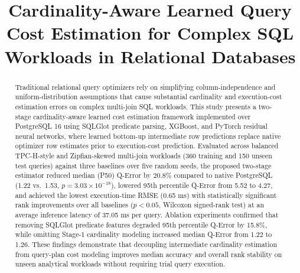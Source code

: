 \documentclass[conference]{IEEEtran}
\begin{document}
\title{Cardinality-Aware Learned Query Cost Estimation for Complex SQL Workloads in Relational Databases}

\author{
\and
{}
}

\maketitle

\begin{abstract}
Traditional relational query optimizers rely on simplifying column-independence and uniform-distribution assumptions that cause substantial cardinality and execution-cost estimation errors on complex multi-join SQL workloads. This study presents a two-stage cardinality-aware learned cost estimation framework implemented over PostgreSQL 16 using SQLGlot predicate parsing, XGBoost, and PyTorch residual neural networks, where learned bottom-up intermediate row predictions replace native optimizer row estimates prior to execution-cost prediction. Evaluated across balanced TPC-H-style and Zipfian-skewed multi-join workloads (360 training and 150 unseen test queries) against three baselines over five random seeds, the proposed two-stage estimator reduced median (P50) Q-Error by 20.8\% compared to native PostgreSQL (1.22 vs.\ 1.53, $p = 3.03 \times 10^{-18}$), lowered 95th percentile Q-Error from 5.52 to 4.27, and achieved the lowest execution-time RMSE (0.65 ms) with statistically significant rank improvements over all baselines ($p < 0.05$, Wilcoxon signed-rank test) at an average inference latency of 37.05 ms per query. Ablation experiments confirmed that removing SQLGlot predicate features degraded 95th percentile Q-Error by 15.8\%, while omitting Stage-1 cardinality modeling increased median Q-Error from 1.22 to 1.26. These findings demonstrate that decoupling intermediate cardinality estimation from query-plan cost modeling improves median accuracy and overall rank stability on unseen analytical workloads without requiring trial query execution.
\end{abstract}
\end{document}
